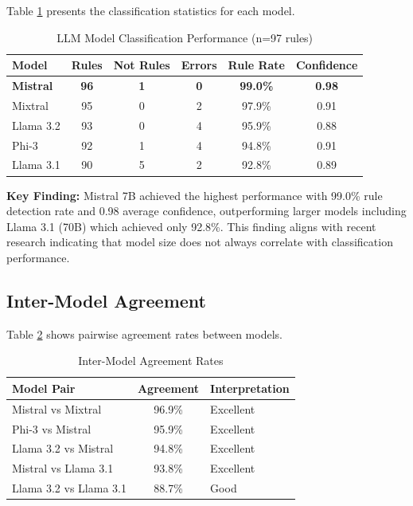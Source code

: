 Table \ref{tab:model-performance} presents the classification statistics for each model.

\begin{table}[h]
\centering
\caption{LLM Model Classification Performance (n=97 rules)}
\label{tab:model-performance}
\begin{tabular}{|l|c|c|c|c|c|}
\hline
\textbf{Model} & \textbf{Rules} & \textbf{Not Rules} & \textbf{Errors} & \textbf{Rule Rate} & \textbf{Confidence} \\
\hline
\textbf{Mistral} & \textbf{96} & \textbf{1} & \textbf{0} & \textbf{99.0\%} & \textbf{0.98} \\
Mixtral & 95 & 0 & 2 & 97.9\% & 0.91 \\
Llama 3.2 & 93 & 0 & 4 & 95.9\% & 0.88 \\
Phi-3 & 92 & 1 & 4 & 94.8\% & 0.91 \\
Llama 3.1 & 90 & 5 & 2 & 92.8\% & 0.89 \\
\hline
\end{tabular}
\end{table}

\textbf{Key Finding:} Mistral 7B achieved the highest performance with 99.0\% rule detection rate and 0.98 average confidence, outperforming larger models including Llama 3.1 (70B) which achieved only 92.8\%. This finding aligns with recent research indicating that model size does not always correlate with classification performance.

\subsection{Inter-Model Agreement}

Table \ref{tab:model-agreement} shows pairwise agreement rates between models.

\begin{table}[h]
\centering
\caption{Inter-Model Agreement Rates}
\label{tab:model-agreement}
\begin{tabular}{|l|c|l|}
\hline
\textbf{Model Pair} & \textbf{Agreement} & \textbf{Interpretation} \\
\hline
Mistral vs Mixtral & 96.9\% & Excellent \\
Phi-3 vs Mistral & 95.9\% & Excellent \\
Llama 3.2 vs Mistral & 94.8\% & Excellent \\
Mistral vs Llama 3.1 & 93.8\% & Excellent \\
Llama 3.2 vs Llama 3.1 & 88.7\% & Good \\
\hline
\end{tabular}
\end{table}

